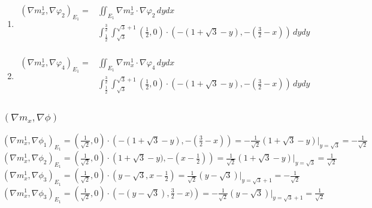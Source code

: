 \documentclass{article}
\begin{document}
{\begin{enumerate}
    \item \begin{align*}
        (\nabla m_x^1,\nabla\varphi_2)_{E_1} =& \iint_{E_1}\nabla m_x^1 \cdot \nabla\varphi_2 \,dydx \\
        & \int_{\frac{1}{2}}^\frac{3}{2}\int_{\sqrt{3}}^{\sqrt{3}+1} \left(\frac{1}{2},0\right)\cdot \left(-\left(1 + \sqrt{3} - y\right),  -\left(\frac{3}{2}-x\right)\right) \,dydy \\
    \end{align*}

    \item \begin{align*}
        (\nabla m_x^1,\nabla\varphi_4)_{E_1} =& \iint_{E_1}\nabla m_x^1 \cdot \nabla\varphi_4 \,dydx \\
        & \int_{\frac{1}{2}}^\frac{3}{2}\int_{\sqrt{3}}^{\sqrt{3}+1} \left(\frac{1}{2},0\right)\cdot \left(-\left(1 + \sqrt{3} - y\right),  -\left(\frac{3}{2}-x\right)\right) \,dydy \\
    \end{align*}
\end{enumerate}


\subsubsection{$(\nabla m_x,\nabla\phi)$}
$(\nabla m_x^1,\nabla\phi_1)_{E_1} = 
\left(\frac{1}{\sqrt{2}},0\right)\cdot\left(-(1 + \sqrt{3} - y),  -(\frac{3}{2}-x)\right) = 
-\frac{1}{\sqrt{2}}(1 + \sqrt{3} - y)|_{y=\sqrt{3}} = 
-\frac{1}{\sqrt{2}}$\\
$(\nabla m_x^1,\nabla\phi_2)_{E_1} = 
\left(\frac{1}{\sqrt{2}},0\right)\cdot\left(1 + \sqrt{3} - y),  -(x-\frac{1}{2})\right) = 
\frac{1}{\sqrt{2}}(1 + \sqrt{3} - y)|_{y=\sqrt{3}} = 
\frac{1}{\sqrt{2}}$\\
$(\nabla m_x^1,\nabla\phi_3)_{E_1} = 
\left(\frac{1}{\sqrt{2}},0\right)\cdot\left(y-\sqrt{3}, x-\frac{1}{2}\right) = 
\frac{1}{\sqrt{2}}(y-\sqrt{3})|_{y=\sqrt{3}+1} = 
-\frac{1}{\sqrt{2}}$\\
$(\nabla m_x^1,\nabla\phi_3)_{E_1} = 
\left(\frac{1}{\sqrt{2}},0\right)\cdot\left(-(y-\sqrt{3}), \frac{3}{2}-x)\right) = 
-\frac{1}{\sqrt{2}}(y-\sqrt{3})|_{y=\sqrt{3}+1} = 
\frac{1}{\sqrt{2}}$\\


}
\end{document}
